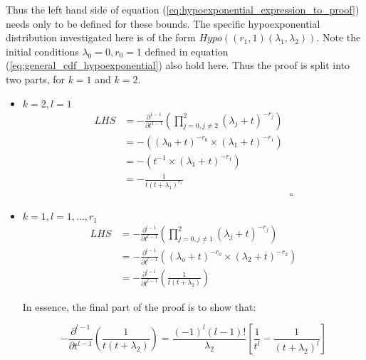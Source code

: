 Thus the left hand side of equation (\ref{eq:hypoexponential_expression_to_proof})
needs only to be defined for these bounds.
The specific hypoexponential distribution investigated here is of the form
\(Hypo((r_1, 1)(\lambda_1, \lambda_2))\).
Note the initial conditions \(\lambda_0=0, r_0=1\) defined in equation
(\ref{eq:general_cdf_hypoexponential}) also hold here.
Thus the proof is split into two parts, for \(k=1\) and \(k=2\).



\begin{itemize}
    \item \(k = 2, l = 1\)
    \begin{equation*}
        \begin{split}
            LHS &= - \frac{\partial^{1-1}}{\partial t^{1-1}}
            \left( \prod_{j=0, j \neq 2}^{2} (\lambda_j + t)^{-r_j} \right) \\
            &=-\left( (\lambda_0 + t)^{-r_0} \times (\lambda_1 + t)^{-r_1}
            \right) \\
            &=-\left( t^{-1} \times (\lambda_1 + t)^{-r_1} \right) \\
            &= - \frac{1}{t(t + \lambda_1)^{r_1}} \\
            & \hspace{7cm} \square
        \end{split}
    \end{equation*}
    \item \(k = 1, l = 1, \dots, r_1\)
    \begin{equation*}
        \begin{split}
            LHS &= -\frac{\partial^{l-1}}{\partial t^{l-1}}
            \left( \prod_{j=0, j \neq 1}^{2} (\lambda_j + t)^{-r_j} \right) \\
            &= -\frac{\partial^{l-1}}{\partial t^{l-1}}
            \left( (\lambda_o + t)^{-r_0} \times (\lambda_2 + t)^{-r_2}
            \right) \\
            &= -\frac{\partial^{l-1}}{\partial t^{l-1}}
            \left( \frac{1}{t(t + \lambda_2)}\right)
        \end{split}
    \end{equation*}

    In essence, the final part of the proof is to show that:

    \[
        -\frac{\partial^{l-1}}{\partial t^{l-1}}
        \left( \frac{1}{t(t + \lambda_2)}\right) =
        \frac{(-1)^{l} (l-1)!}{\lambda_2}\left[\frac{1}{t^l} - \frac{1}{(t +
        \lambda_2)^l}\right]
    \]


\end{itemize}
